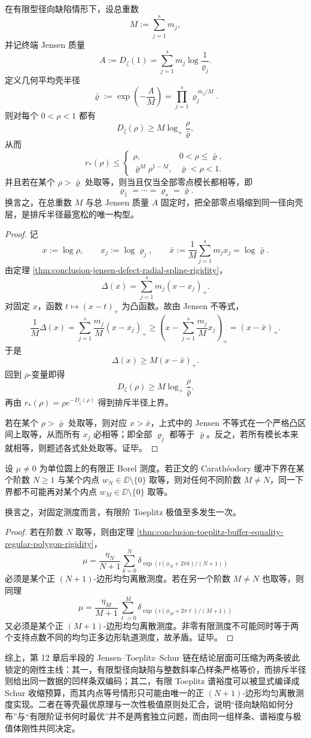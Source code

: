 \begin{theorem}[固定总缺陷质量下的等壳最优原理]\label{thm:conclusion-equal-shell-extremal-principle}
在有限型径向缺陷情形下，设总重数
\[
M:=\sum_{j=1}^{s}m_j,
\]
并记终端 Jensen 质量
\[
A:=D_\zeta(1)=\sum_{j=1}^{s}m_j\log\frac{1}{\varrho_j}.
\]
定义几何平均壳半径
\[
\bar\varrho:=
\exp\!\left(-\frac{A}{M}\right)
=
\prod_{j=1}^{s}\varrho_j^{\,m_j/M}.
\]
则对每个 \(0<\rho<1\) 都有
\[
D_\zeta(\rho)\ge M\log_+\frac{\rho}{\bar\varrho},
\]
从而
\[
r_*(\rho)\le
\begin{cases}
\rho,& 0<\rho\le \bar\varrho,\\[4pt]
\bar\varrho^{M}\rho^{1-M},& \bar\varrho<\rho<1.
\end{cases}
\]
并且若在某个 \(\rho>\bar\varrho\) 处取等，则当且仅当全部零点模长都相等，即
\[
\varrho_1=\cdots=\varrho_s=\bar\varrho.
\]
换言之，在总重数 \(M\) 与总 Jensen 质量 \(A\) 固定时，把全部零点塌缩到同一径向壳层，是排斥半径最宽松的唯一构型。
\end{theorem}
\begin{proof}
记
\[
x:=\log \rho,
\qquad
x_j:=\log \varrho_j,
\qquad
\bar x:=\frac{1}{M}\sum_{j=1}^{s}m_jx_j=\log\bar\varrho.
\]
由定理 \ref{thm:conclusion-jensen-defect-radial-spline-rigidity}，
\[
\Delta(x)=\sum_{j=1}^{s}m_j(x-x_j)_+.
\]
对固定 \(x\)，函数 \(t\mapsto (x-t)_+\) 为凸函数。故由 Jensen 不等式，
\[
\frac{1}{M}\Delta(x)
=
\sum_{j=1}^{s}\frac{m_j}{M}(x-x_j)_+
\ge
\left(x-\sum_{j=1}^{s}\frac{m_j}{M}x_j\right)_+
=(x-\bar x)_+.
\]
于是
\[
\Delta(x)\ge M(x-\bar x)_+.
\]
回到 \(\rho\)-变量即得
\[
D_\zeta(\rho)\ge M\log_+\frac{\rho}{\bar\varrho}.
\]
再由 \(r_*(\rho)=\rho e^{-D_\zeta(\rho)}\) 得到排斥半径上界。

若在某个 \(\rho>\bar\varrho\) 处取等，则对应 \(x>\bar x\)，上式中的 Jensen 不等式在一个严格凸区间上取等，从而所有 \(x_j\) 必相等；即全部 \(\varrho_j\) 都等于 \(\bar\varrho\)。反之，若所有模长本来就相等，则题述各式处处取等。证毕。
\end{proof}

\begin{corollary}[极值阶数的一次性原理]\label{cor:conclusion-toeplitz-extremality-one-shot}
设 \(\mu\neq 0\) 为单位圆上的有限正 Borel 测度。若正文的 Carath\'eodory 缓冲下界在某个阶数 \(N\ge 1\) 与某个内点 \(w_N\in\DD\setminus\{0\}\) 取等，则对任何不同阶数 \(M\neq N\)，同一下界都不可能再对某个内点 \(w_M\in\DD\setminus\{0\}\) 取等。

换言之，对固定测度而言，有限阶 Toeplitz 极值至多发生一次。
\end{corollary}
\begin{proof}
若在阶数 \(N\) 取等，则由定理 \ref{thm:conclusion-toeplitz-buffer-equality-regular-polygon-rigidity}，
\[
\mu=\frac{\eta_N}{N+1}\sum_{k=0}^{N}
\delta_{\exp(i(\phi_N+2\pi k)/(N+1))}
\]
必须是某个正 \((N+1)\)-边形均匀离散测度。若在另一个阶数 \(M\neq N\) 也取等，则同理
\[
\mu=\frac{\eta_M}{M+1}\sum_{\ell=0}^{M}
\delta_{\exp(i(\phi_M+2\pi \ell)/(M+1))}
\]
又必须是某个正 \((M+1)\)-边形均匀离散测度。非零有限测度不可能同时等于两个支持点数不同的均匀正多边形轨道测度，故矛盾。证毕。
\end{proof}

综上，第 12 章后半段的 Jensen--Toeplitz--Schur 链在结论层面可压缩为两条彼此锁定的刚性主线：其一，有限型径向缺陷与整数斜率凸样条严格等价，而排斥半径则给出同一数据的凹样条双编码；其二，有限 Toeplitz 谱裕度可以被显式编译成 Schur 收缩预算，而其内点等号情形只可能由唯一的正 \((N+1)\)-边形均匀离散测度实现。二者在等壳最优原理与一次性极值原则处汇合，说明“径向缺陷如何分布”与“有限阶证书何时最优”并不是两套独立问题，而由同一组样条、谱裕度与极值体刚性共同决定。
